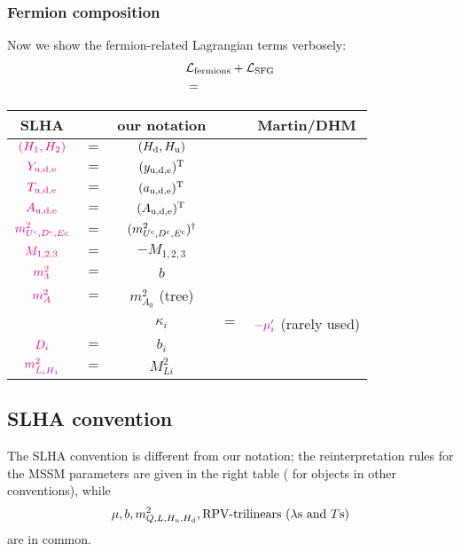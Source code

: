 \documentclass[CheatSheet]{subfiles}
\begin{document}
\subsubsection{Fermion composition}
Now we show the fermion-related Lagrangian terms verbosely:
\begin{equation}
  \begin{split}
&  \mathcal L_{\mathrm{fermions}} + \mathcal L_{\mathrm{SFG}}
\\&=
\end{split}
\end{equation}




\newpage
\begin{wraptable}{r}{200pt}\vspace{-3em}
 \begin{tabular}[t]{c@{\,}c@{\,}c@{\,}c@{\,}c}\toprule
 SLHA  && our notation && Martin/DHM\\\midrule
 ${\color{magenta}(H_1, H_2)}$              &$=$& $(H_{\mathrm{d}}, H_{\mathrm{u}})$ \\\midrule
 ${\color{magenta}Y_{\mathrm{u,d,e}}}$      &$=$& $(y_{\mathrm{u,d,e}})^{\mathrm{T}}$\\
 ${\color{magenta}T_{\mathrm{u,d,e}}}$      &$=$& $(a_{\mathrm{u,d,e}})^{\mathrm{T}}$\\
 ${\color{magenta}A_{\mathrm{u,d,e}}}$      &$=$& $(A_{\mathrm{u,d,e}})^{\mathrm{T}}$\\
 ${\color{magenta}m^2_{U^{\mathrm{c}},D^{\mathrm{c}}, E\mathrm{c}}}$ &$=$& $(m^2_{U^{\mathrm{c}},D^{\mathrm{c}}, E^{\mathrm{c}}})^\dagger$\\
 ${\color{magenta}M_{1,2,3}}$               &$=$& $-M_{1,2,3}$\\
 ${\color{magenta}m_3^2}$                   &$=$& $b$\\
 ${\color{magenta}m_A^2}$                   &$=$& $m^2_{A_0}$ (tree)\\\midrule
 &&$\kappa_i$ &$=$& ${\color{magenta}-\mu_i'}$ \footnotesize{(rarely used)}\\
 ${\color{magenta}D_i}$                     &$=$& $b_i$\\
 ${\color{magenta}m^2_{\tilde L_iH_1}}$     &$=$& $M^2_{Li}$ \\\bottomrule
 \end{tabular}
\end{wraptable}

\subsection{SLHA convention}
The SLHA convention \cite{SLHA} is different from our notation; the reinterpretation rules for the MSSM parameters are given in the right table  (\textbf{} for objects in other conventions), while
\begin{equation*}
  \mu, b, m^2_{Q, L, H_{\mathrm{u}}, H_{\mathrm{d}}}, \text{RPV-trilinears ($\lambda$s and $T$s)}
\end{equation*}
 are in common.
\end{document}
